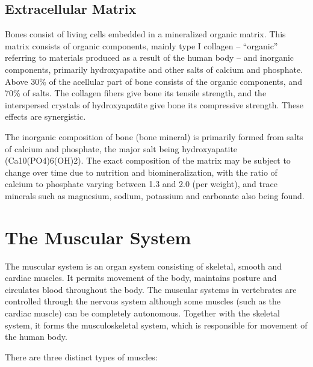 \hypertarget{extracellular-matrix}{%
\subsection{Extracellular Matrix}\label{extracellular-matrix}}

Bones consist of living cells embedded in a mineralized organic matrix. This matrix consists of organic components, mainly type I collagen -- ``organic'' referring to materials produced as a result of the human body -- and inorganic components, primarily hydroxyapatite and other salts of calcium and phosphate. Above 30\% of the acellular part of bone consists of the organic components, and 70\% of salts. The collagen fibers give bone its tensile strength, and the interspersed crystals of hydroxyapatite give bone its compressive strength. These effects are synergistic.

The inorganic composition of bone (bone mineral) is primarily formed from salts of calcium and phosphate, the major salt being hydroxyapatite (Ca10(PO4)6(OH)2). The exact composition of the matrix may be subject to change over time due to nutrition and biomineralization, with the ratio of calcium to phosphate varying between 1.3 and 2.0 (per weight), and trace minerals such as magnesium, sodium, potassium and carbonate also being found.

\hypertarget{the-muscular-system}{%
\section{The Muscular System}\label{the-muscular-system}}

The muscular system is an organ system consisting of skeletal, smooth and cardiac muscles. It permits movement of the body, maintains posture and circulates blood throughout the body. The muscular systems in vertebrates are controlled through the nervous system although some muscles (such as the cardiac muscle) can be completely autonomous. Together with the skeletal system, it forms the musculoskeletal system, which is responsible for movement of the human body.

There are three distinct types of muscles:

